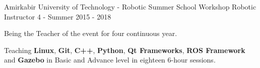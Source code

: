 \begin{cventries}
  \cventry
    {Amirkabir University of Technology - Robotic Summer School} %
    {Workshop Robotic Instructor} %
    {4 - Summer} %
    {2015 - 2018} %
    {
      \begin{cvitems} %
        \item {Being the Teacher of the event for four continuous year.}
        \item {Teaching \textbf{Linux}, \textbf{Git}, \textbf{C++}, \textbf{Python}, \textbf{Qt Frameworks}, \textbf{ROS Framework} and \textbf{Gazebo} in Basic and Advance level in eighteen 6-hour sessions.}
      \end{cvitems}
    }
    
    



\end{cventries}

